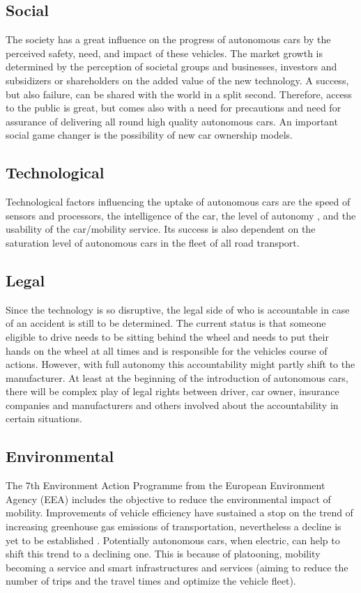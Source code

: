 \documentclass[a4paper]{article}
\begin{document}
\subsection{Social}
\label{sec:social}
The society has a great influence on the progress of autonomous cars by the perceived safety, need, and impact of these vehicles. The market growth is determined by the perception of societal groups and businesses, investors and subsidizers or shareholders on the added value of the new technology. A success, but also failure, can be shared with the world in a split second. Therefore, access to the public is great, but comes also with a need for precautions and need for assurance of delivering all round high quality autonomous cars. 
An important social game changer is the possibility of new car ownership models.

\subsection{Technological}
\label{sec:technological}
Technological factors influencing the uptake of autonomous cars are the speed of sensors and processors, the intelligence of the car, the level of autonomy \cite{KAUR201887}, and the usability of the car/mobility service. Its success is also dependent on the saturation level of autonomous cars in the fleet of all road transport.

\subsection{Legal}
\label{sec:not-gal}
Since the technology is so disruptive, the legal side of who is accountable in case of an accident is still to be determined. The current status is that someone eligible to drive needs to be sitting behind the wheel and needs to put their hands on the wheel at all times and is responsible for the vehicles course of actions. However, with full autonomy this accountability might partly shift to the manufacturer. At least at the beginning of the introduction of autonomous cars, there will be complex play of legal rights between driver, car owner, insurance companies and manufacturers and others involved about the accountability in certain situations.

\subsection{Environmental}
\label{sec:environmental}

The 7th Environment Action Programme from the European Environment Agency (EEA) includes the objective to reduce the environmental impact of mobility. Improvements of vehicle efficiency have sustained a stop on the trend of increasing greenhouse gas emissions of transportation, nevertheless a decline is yet to be established \cite{EEA}. Potentially autonomous cars, when electric, can help to shift this trend to a declining one. This is because of platooning, mobility becoming a service and smart infrastructures and services (aiming to reduce the number of trips and the travel times and optimize the vehicle fleet).
\end{document}
